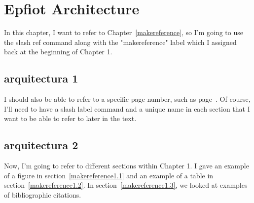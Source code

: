 
\cleardoublepage

\chapter{Epfiot Architecture}
\label{makereference4}

In this chapter, I want to refer to Chapter~\ref{makereference},
so I'm going to use the slash ref command along with the
"makereference" label which I assigned back at the beginning of
Chapter 1.

\section{arquitectura 1}
\label{makereference4.1} I should also be able to refer to a
specific page number, such as page~\pageref{makereference}.  Of
course, I'll need to have a slash label command and a unique name
in each section that I want to be able to refer to later in the
text.

\section{arquitectura 2}
\label{makereference4.2} Now, I'm going to refer to different
sections within Chapter 1. I gave an example of a figure in
section~\ref{makereference1.1} and an example of a table in
section~\ref{makereference1.2}.  In
section~\ref{makereference1.3}, we looked at examples of
bibliographic citations.
